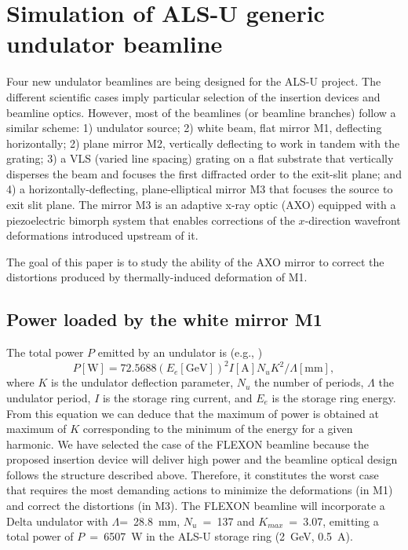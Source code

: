 \documentclass{iucr}
\begin{document}
%
%
%
\section{Simulation of ALS-U generic undulator beamline}
\label{sec:main}

Four new undulator beamlines are being designed for the ALS-U project. The different scientific cases imply particular selection of the insertion devices and beamline optics. However, most of the beamlines (or beamline branches) follow a similar scheme: 1) undulator source; 2) white beam, flat mirror M1, deflecting horizontally; 2) plane mirror M2, vertically deflecting to work in tandem with the grating; 3) a VLS (varied line spacing) grating on a flat substrate that vertically disperses the beam and focuses the first diffracted order to the exit-slit plane; and 4) a horizontally-deflecting, plane-elliptical mirror M3 that focuses the source to exit slit plane. The mirror M3 is an adaptive x-ray optic (AXO) equipped with a piezoelectric bimorph system that enables corrections of the $x$-direction wavefront deformations introduced upstream of it.

The goal of this paper is to study the ability of the AXO mirror to correct the distortions produced by thermally-induced deformation of M1.


\subsection{Power loaded by the white mirror M1}

The total power $P$ emitted by an undulator is (e.g., \cite{elleaume})
\begin{equation}
    P[\textrm{W}] = 72.5688 (E_e [\textrm{GeV}])^2  I[\textrm{A}]  N_u  K^2 / \Lambda[\textrm{mm}],
\end{equation}
where $K$ is the undulator deflection parameter, $N_u$ the number of periods, $\Lambda$ the undulator period, $I$ is the storage ring current, and $E_e$ is the storage ring energy. From this equation we can deduce that the maximum of power is obtained at maximum of $K$ corresponding to the minimum of the energy for a given harmonic.  We have selected the case of the FLEXON beamline because the proposed insertion device will deliver high power and the beamline optical design follows the structure described above. Therefore, it constitutes the worst case that requires the most demanding actions to minimize the deformations (in M1) and correct the distortions (in M3). The FLEXON beamline will incorporate a Delta undulator \cite{deltaundulator} with $\Lambda$=~28.8~mm, $N_u$~=~137 and $K_{max}$~=~3.07, emitting a total power of $P$~=~6507~W in the ALS-U storage ring (2~GeV, 0.5~A).
\end{document}
